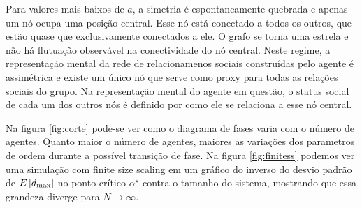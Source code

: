Para valores mais baixos de $a$, a simetria é espontaneamente quebrada e apenas um nó ocupa uma posição central. Esse nó está conectado a todos os outros, que estão quase que exclusivamente conectados a ele. O grafo se torna uma estrela e não há flutuação observável na conectividade do nó central. Neste regime, a representação mental da rede de relacionamenos sociais construídas pelo agente é assimétrica e existe um único nó que serve como proxy para todas as relações sociais do grupo. Na representação mental do agente em questão, o status social de cada um dos outros nós é definido por como ele se relaciona a esse nó central.

Na figura \ref{fig:corte} pode-se ver como o diagrama de fases varia com o número de agentes. Quanto maior o número de agentes, maiores as variações dos parametros de ordem durante a possível transição de fase. Na figura \ref{fig:finitess} podemos ver uma simulação com finite size scaling em um gráfico do inverso do desvio padrão de $E\left[d_{\text{max}}\right]$ no ponto crítico $\alpha^{\star}$ contra o tamanho do sistema, mostrando que essa grandeza diverge para $N\to \infty$.


